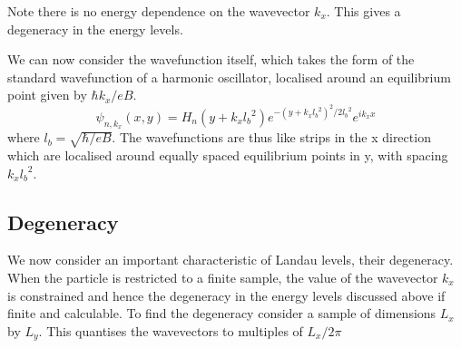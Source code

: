 Note there is no energy dependence on the wavevector $k_x$. This gives a degeneracy in the energy levels. \par
We can now consider the wavefunction itself, which takes the form of the standard wavefunction of a harmonic oscillator, localised around an equilibrium point given by $\hbar k_x/eB$.
\begin{equation}
    \psi_{n,k_x}(x,y)=H_n\left(y+k_x{l_b}^2\right)e^{-\left(y+k_x{l_b}^2\right)^2/2{l_b}^2}e^{ik_xx}
\end{equation}
where $l_b=\sqrt{\hbar/eB}$. The wavefunctions are thus like strips in the x direction which are localised around equally spaced equilibrium points in y, with spacing $k_x{l_b}^2$.
\subsection{Degeneracy}
We now consider an important characteristic of Landau levels, their degeneracy. When the particle is restricted to a finite sample, the value of the wavevector $k_x$ is constrained and hence the degeneracy in the energy levels discussed above if finite and calculable. To find the degeneracy consider a sample of dimensions $L_x$ by $L_y$. This quantises the wavevectors to multiples of $L_x/2\pi$